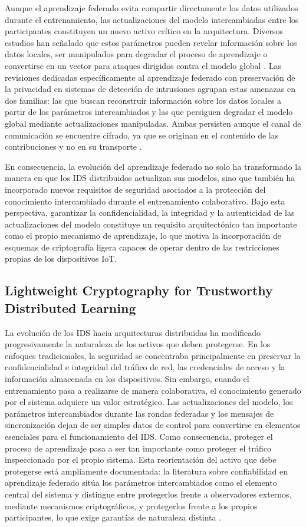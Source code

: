 \documentclass[journal,article,submit,moreauthors]{Definitions/mdpi}
\begin{document}
Aunque el aprendizaje federado evita compartir directamente los datos utilizados durante el entrenamiento, las actualizaciones del modelo intercambiadas entre los participantes constituyen un nuevo activo crítico en la arquitectura. Diversos estudios han señalado que estos parámetros pueden revelar información sobre los datos locales, ser manipulados para degradar el proceso de aprendizaje o convertirse en un vector para ataques dirigidos contra el modelo global \cite{Imteaj2022,Hajj2023}. Las revisiones dedicadas específicamente al aprendizaje federado con preservación de la privacidad en sistemas de detección de intrusiones agrupan estas amenazas en dos familias: las que buscan reconstruir información sobre los datos locales a partir de los parámetros intercambiados y las que persiguen degradar el modelo global mediante actualizaciones manipuladas. Ambas persisten aunque el canal de comunicación se encuentre cifrado, ya que se originan en el contenido de las contribuciones y no en su transporte \cite{Bunko2026}.

En consecuencia, la evolución del aprendizaje federado no solo ha transformado la manera en que los IDS distribuidos actualizan sus modelos, sino que también ha incorporado nuevos requisitos de seguridad asociados a la protección del conocimiento intercambiado durante el entrenamiento colaborativo. Bajo esta perspectiva, garantizar la confidencialidad, la integridad y la autenticidad de las actualizaciones del modelo constituye un requisito arquitectónico tan importante como el propio mecanismo de aprendizaje, lo que motiva la incorporación de esquemas de criptografía ligera capaces de operar dentro de las restricciones propias de los dispositivos IoT.

\subsection{Lightweight Cryptography for Trustworthy Distributed Learning}
La evolución de los IDS hacia arquitecturas distribuidas ha modificado progresivamente la naturaleza de los activos que deben protegerse. En los enfoques tradicionales, la seguridad se concentraba principalmente en preservar la confidencialidad e integridad del tráfico de red, las credenciales de acceso y la información almacenada en los dispositivos. Sin embargo, cuando el entrenamiento pasa a realizarse de manera colaborativa, el conocimiento generado por el sistema adquiere un valor estratégico. Las actualizaciones del modelo, los parámetros intercambiados durante las rondas federadas y los mensajes de sincronización dejan de ser simples datos de control para convertirse en elementos esenciales para el funcionamiento del IDS. Como consecuencia, proteger el proceso de aprendizaje pasa a ser tan importante como proteger el tráfico inspeccionado por el propio sistema. Esta reorientación del activo que debe protegerse está ampliamente documentada: la literatura sobre confiabilidad en aprendizaje federado sitúa los parámetros intercambiados como el elemento central del sistema y distingue entre protegerlos frente a observadores externos, mediante mecanismos criptográficos, y protegerlos frente a los propios participantes, lo que exige garantías de naturaleza distinta \cite{Bunko2026,Alshammari2026}.
\end{document}
